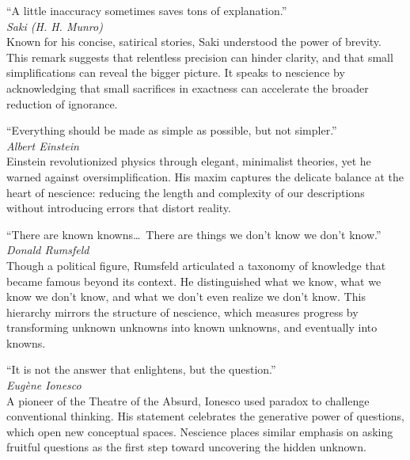 \vspace{1em}

\noindent
\textquotedblleft A little inaccuracy sometimes saves tons of explanation.\textquotedblright \\
\emph{Saki (H. H. Munro)} \\
Known for his concise, satirical stories, Saki understood the power of brevity. This remark suggests that relentless precision can hinder clarity, and that small simplifications can reveal the bigger picture. It speaks to nescience by acknowledging that small sacrifices in exactness can accelerate the broader reduction of ignorance.

\vspace{1em}

\noindent
\textquotedblleft Everything should be made as simple as possible, but not simpler.\textquotedblright \\
\emph{Albert Einstein} \\
Einstein revolutionized physics through elegant, minimalist theories, yet he warned against oversimplification. His maxim captures the delicate balance at the heart of nescience: reducing the length and complexity of our descriptions without introducing errors that distort reality.

\vspace{1em}

\noindent
\textquotedblleft There are known knowns\ldots\ There are things we don't know we don't know.\textquotedblright \\
\emph{Donald Rumsfeld} \\
Though a political figure, Rumsfeld articulated a taxonomy of knowledge that became famous beyond its context. He distinguished what we know, what we know we don't know, and what we don't even realize we don't know. This hierarchy mirrors the structure of nescience, which measures progress by transforming unknown unknowns into known unknowns, and eventually into knowns.

\vspace{1em}

\noindent
\textquotedblleft It is not the answer that enlightens, but the question.\textquotedblright \\
\emph{Eugène Ionesco} \\
A pioneer of the Theatre of the Absurd, Ionesco used paradox to challenge conventional thinking. His statement celebrates the generative power of questions, which open new conceptual spaces. Nescience places similar emphasis on asking fruitful questions as the first step toward uncovering the hidden unknown.

